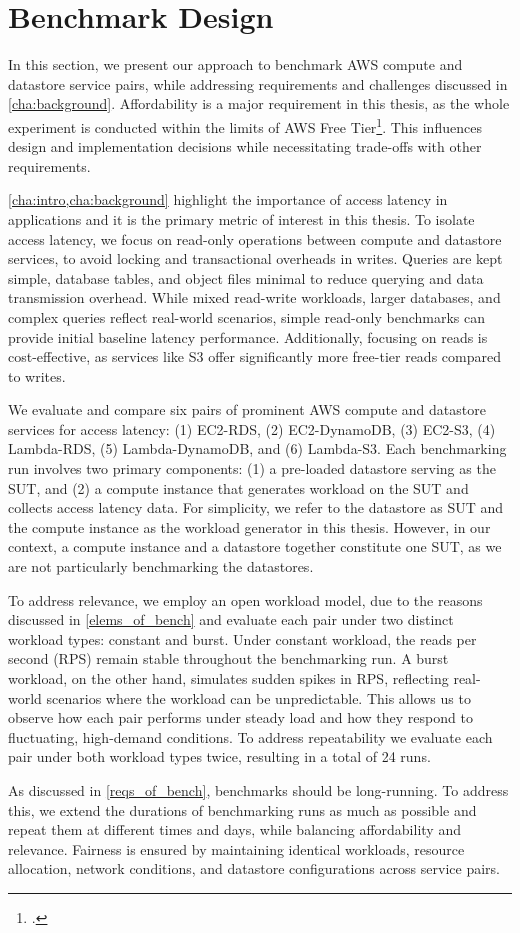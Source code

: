 \section{Benchmark Design}
\label{cha:approach}

In this section, we present our approach to benchmark AWS compute and datastore service pairs, while addressing requirements and challenges discussed in \cref{cha:background}. Affordability is a major requirement in this thesis, as the whole experiment is conducted within the limits of AWS Free Tier\footcite{https://aws.amazon.com/free/}. This influences design and implementation decisions while necessitating trade-offs with other requirements.

\cref{cha:intro,cha:background} highlight the importance of access latency in applications and it is the primary metric of interest in this thesis. To isolate access latency, we focus on read-only operations between compute and datastore services, to avoid locking and transactional overheads in writes. Queries are kept simple, database tables, and object files minimal to reduce querying and data transmission overhead. While mixed read-write workloads, larger databases, and complex queries reflect real-world scenarios, simple read-only benchmarks can provide initial baseline latency performance. Additionally, focusing on reads is cost-effective, as services like S3 offer significantly more free-tier reads compared to writes.

We evaluate and compare six pairs of prominent AWS compute and datastore services for access latency: (1) EC2-RDS, (2) EC2-DynamoDB, (3) EC2-S3, (4) Lambda-RDS, (5) Lambda-DynamoDB, and (6) Lambda-S3. Each benchmarking run involves two primary components: (1) a pre-loaded datastore serving as the SUT, and (2) a compute instance that generates workload on the SUT and collects access latency data. For simplicity, we refer to the datastore as SUT and the compute instance as the workload generator in this thesis. However, in our context, a compute instance and a datastore together constitute one SUT, as we are not particularly benchmarking the datastores.

To address relevance, we employ an open workload model, due to the reasons discussed in \cref{elems_of_bench} and evaluate each pair under two distinct workload types: constant and burst. Under constant workload, the reads per second (RPS) remain stable throughout the benchmarking run. A burst workload, on the other hand, simulates sudden spikes in RPS, reflecting real-world scenarios where the workload can be unpredictable. This allows us to observe how each pair performs under steady load and how they respond to fluctuating, high-demand conditions. To address repeatability we evaluate each pair under both workload types twice, resulting in a total of 24 runs.

As discussed in \cref{reqs_of_bench}, benchmarks should be long-running. To address this, we extend the durations of benchmarking runs as much as possible and repeat them at different times and days, while balancing affordability and relevance. Fairness is ensured by maintaining identical workloads, resource allocation, network conditions, and datastore configurations across service pairs.
